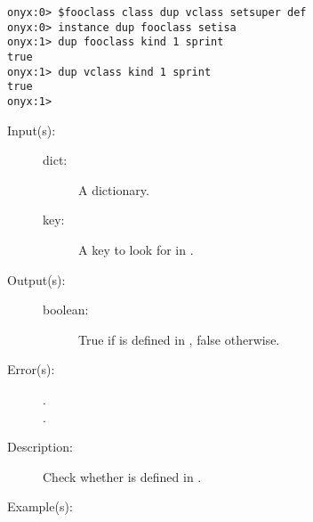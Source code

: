 \begin{description}
\begin{description}
\begin{verbatim}
onyx:0> $fooclass class dup vclass setsuper def
onyx:0> instance dup fooclass setisa
onyx:1> dup fooclass kind 1 sprint
true
onyx:1> dup vclass kind 1 sprint
true
onyx:1>
		\end{verbatim}
	\end{description}
\label{systemdict:known}
\item[{\onyxop{dict key}{known}{boolean}}: ]
	\begin{description}\item[]
	\item[Input(s): ]
		\begin{description}\item[]
		\item[dict: ]
			A dictionary.
		\item[key: ]
			A key to look for in .
		\end{description}
	\item[Output(s): ]
		\begin{description}\item[]
		\item[boolean: ]
			True if  is defined in , false
			otherwise.
		\end{description}
	\item[Error(s): ]
		\begin{description}\item[]
		\item[.]
		\item[.]
		\end{description}
	\item[Description: ]
		Check whether  is defined in .
	\item[Example(s): ]\begin{verbatim}


\end{verbatim}
\end{description}
\end{description}
